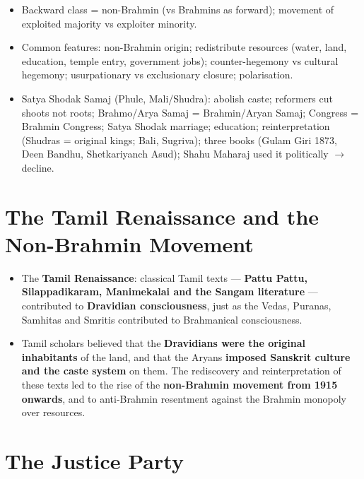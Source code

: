 \begin{QuickRevision}
\begin{itemize}
\item Backward class = non-Brahmin (vs Brahmins as forward); movement of exploited majority vs exploiter minority.
\item Common features: non-Brahmin origin; redistribute resources (water, land, education, temple entry, government jobs); counter-hegemony vs cultural hegemony; usurpationary vs exclusionary closure; polarisation.
\item Satya Shodak Samaj (Phule, Mali/Shudra): abolish caste; reformers cut shoots not roots; Brahmo/Arya Samaj = Brahmin/Aryan Samaj; Congress = Brahmin Congress; Satya Shodak marriage; education; reinterpretation (Shudras = original kings; Bali, Sugriva); three books (Gulam Giri 1873, Deen Bandhu, Shetkariyanch Asud); Shahu Maharaj used it politically $\rightarrow$ decline.
\end{itemize}
\end{QuickRevision}

\section{The Tamil Renaissance and the Non-Brahmin Movement}

\begin{KeyConcept}
\begin{itemize}
\item The \textbf{Tamil Renaissance}: classical Tamil texts --- \textbf{Pattu Pattu, Silappadikaram, Manimekalai and the Sangam literature} --- contributed to \textbf{Dravidian consciousness}, just as the Vedas, Puranas, Samhitas and Smritis contributed to Brahmanical consciousness.
\item Tamil scholars believed that the \textbf{Dravidians were the original inhabitants} of the land, and that the Aryans \textbf{imposed Sanskrit culture and the caste system} on them. The rediscovery and reinterpretation of these texts led to the rise of the \textbf{non-Brahmin movement from 1915 onwards}, and to anti-Brahmin resentment against the Brahmin monopoly over resources.
\end{itemize}
\end{KeyConcept}

\section{The Justice Party}

